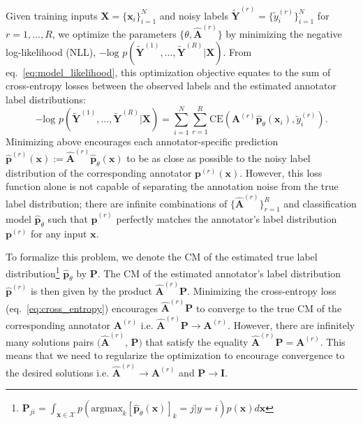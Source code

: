 Given training inputs $\mathbf{X} = \{\mathbf{x}_i\}_{i=1}^{N}$ and noisy labels $\widetilde{\mathbf{Y}}^{(r)} = \{ \tilde{y}^{(r)}_{i}\}_{i=1}^{N}$ for $r=1,...,R$, we optimize the parameters $\{\theta, \hat{\mathbf{A}}^{(r)}\}$ by minimizing the negative log-likelihood (NLL), $- \text{log } p(\widetilde{\mathbf{Y}}^{(1)}, ..., \widetilde{\mathbf{Y}}^{(R)}|\mathbf{X})$. From eq.~\ref{eq:model_likelihood}, this optimization objective equates to the sum of cross-entropy losses between the observed labels and the estimated annotator label distributions:
\begin{equation}\label{eq:cross_entropy}
- \text{log } p(\widetilde{\mathbf{Y}}^{(1)}, ..., \widetilde{\mathbf{Y}}^{(R)}|\mathbf{X}) = \sum_{i=1}^{N}\sum_{r=1}^{R}\text{CE}(\textbf{A}^{(r)}\hat{\textbf{p}}_{\theta}(\mathbf{x}_i), \tilde{y}^{(r)}_{i}).
\end{equation}
Minimizing above encourages each annotator-specific prediction $\hat{\mathbf{p}}^{(r)}(\mathbf{x}) :=\hat{\textbf{A}}^{(r)}\hat{\textbf{p}}_{\theta}(\mathbf{x})$ to be as close as possible to the noisy label distribution of the corresponding annotator $\textbf{p}^{(r)}(\mathbf{x})$. However, this loss function alone is not capable of separating the annotation noise from the true label distribution; there are infinite combinations of $\{\hat{\mathbf{A}}^{(r)}\}_{r=1}^R$ and classification model $\hat{\mathbf{p}}_{\theta}$ such that $\hat{\mathbf{p}}^{(r)}$ perfectly matches the annotator's label distribution $\mathbf{p}^{(r)}$ for any input $\mathbf{x}$. 

To formalize this problem, we denote the CM of the estimated true label distribution\footnote{$\textbf{P}_{ji} = \int_{\mathbf{x} \in \mathcal{X}}p(\text{argmax}_{k}[\hat{\textbf{p}}_{\theta}(\mathbf{x})]_{k}=j|y=i)p(\mathbf{x})d\mathbf{x}$} $\hat{\textbf{p}}_{\theta}$ by $\mathbf{P}$. The CM of the estimated annotator's label distribution $\hat{\mathbf{p}}^{(r)}$ is then given by the product $\hat{\textbf{A}}^{(r)}\textbf{P}$. Minimizing the cross-entropy loss (eq.~\ref{eq:cross_entropy}) encourages $\hat{\textbf{A}}^{(r)}\textbf{P}$ to converge to the true CM of the corresponding annotator $\textbf{A}^{(r)}$ i.e. $\hat{\textbf{A}}^{(r)}\textbf{P}\rightarrow \textbf{A}^{(r)}$. However, there are infinitely many solutions pairs $(\hat{\textbf{A}}^{(r)}$, $\textbf{P})$ that satisfy the equality $\hat{\textbf{A}}^{(r)}\textbf{P}= \textbf{A}^{(r)}$. This means that we need to regularize the optimization to encourage convergence to the desired solutions i.e. $\hat{\textbf{A}}^{(r)}\rightarrow\textbf{A}^{(r)}$ and $\textbf{P}\rightarrow \mathbf{I}$. 

